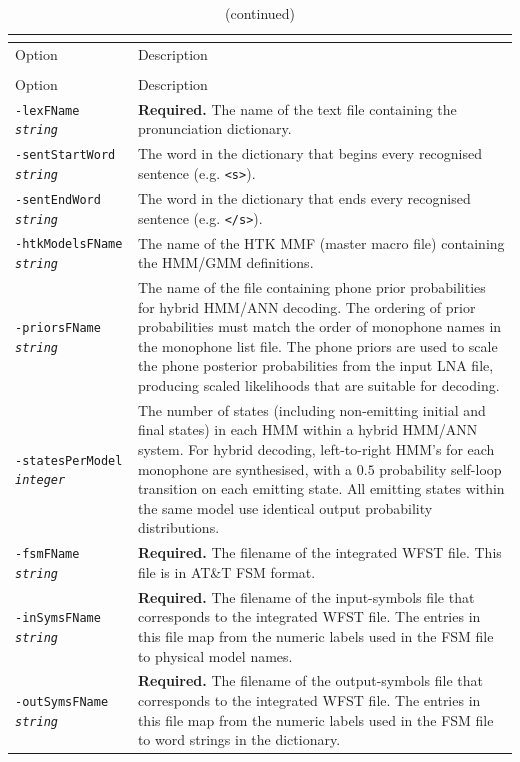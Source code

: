 \documentclass[a4paper,12pt]{report}
\begin{document}
\begin{center}
\begin{longtable}{lp{9cm}}
\caption{Detailed description of {\tt juicer} command line options.} \\
\label{tab:juicer_ref} \\
\hline
Option & Description \\
\hline
\endfirsthead
\caption{(continued)} \\
\hline
Option & Description \\
\hline
\endhead
\hline
\endfoot
{\tt -lexFName \emph{string}} & {\bf Required.} The name of the text file containing the pronunciation dictionary. \\
{\tt -sentStartWord \emph {string}} & The word in the dictionary that begins every recognised sentence (e.g. {\tt <s>}). \\
{\tt -sentEndWord \emph{string}} & The word in the dictionary that ends every recognised sentence (e.g. {\tt </s>}). \\
{\tt -htkModelsFName \emph{string}} & The name of the HTK MMF (master macro file) containing the HMM/GMM definitions. \\
{\tt -priorsFName \emph{string}} & The name of the file containing phone prior probabilities for hybrid HMM/ANN decoding. The ordering of prior probabilities must match the order of monophone names in the monophone list file. The phone priors are used to scale the phone posterior probabilities from the input LNA file, producing scaled likelihoods that are suitable for decoding. \\
{\tt -statesPerModel \emph{integer}} & The number of states (including non-emitting initial and final states) in each HMM within a hybrid HMM/ANN system. For hybrid decoding, left-to-right HMM's for each monophone are synthesised, with a $0.5$ probability self-loop transition on each emitting state. All emitting states within the same model use identical output probability distributions. \\
{\tt -fsmFName \emph{string}} & {\bf Required.} The filename of the integrated WFST file. This file is in AT\&T FSM format. \\
{\tt -inSymsFName \emph{string}} & {\bf Required.} The filename of the input-symbols file that corresponds to the integrated WFST file. The entries in this file map from the numeric labels used in the FSM file to physical model names. \\
{\tt -outSymsFName \emph{string}} & {\bf Required.} The filename of the output-symbols file that corresponds to the integrated WFST file. The entries in this file map from the numeric labels used in the FSM file to word strings in the dictionary. \\

\end{longtable}
\end{center}
\end{document}
